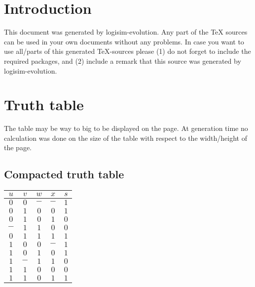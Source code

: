 \documentclass [15pt,a4paper,twoside]{article}
\begin{document}
\section{Introduction}
This document was generated by logisim-evolution. Any part of the TeX sources can be used in your own documents without any problems. In case you want to use all/parts of this generated TeX-sources please (1) do not forget to include the required packages, and (2) include a remark that this source was generated by logisim-evolution.
\section{Truth table}
The table may be way to big to be displayed on the page. At generation time no calculation was done on the size of the table with respect to the width/height of the page.
\subsection{Compacted truth table}
\begin{center}
\begin{tabular}{cccc|c}
$u$&$v$&$w$&$x$&$s$\\
\hline
$0$&$0$&$-$&$-$&$1$\\
$0$&$1$&$0$&$0$&$1$\\
$0$&$1$&$0$&$1$&$0$\\
$-$&$1$&$1$&$0$&$0$\\
$0$&$1$&$1$&$1$&$1$\\
$1$&$0$&$0$&$-$&$1$\\
$1$&$0$&$1$&$0$&$1$\\
$1$&$-$&$1$&$1$&$0$\\
$1$&$1$&$0$&$0$&$0$\\
$1$&$1$&$0$&$1$&$1$\\

\end{tabular}
\end{center}
\end{document}
